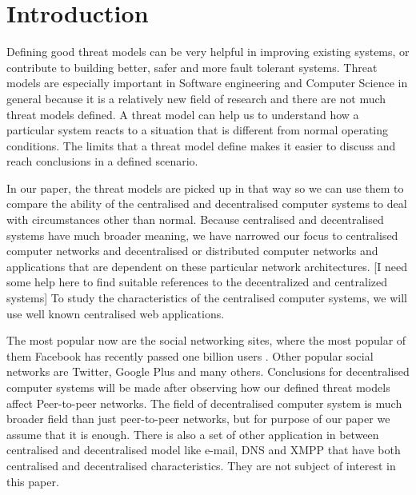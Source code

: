 \section{Introduction}
Defining good threat models can be very helpful in improving existing systems, or contribute to building better, safer and more fault tolerant systems. Threat models are especially important in Software engineering and Computer Science in general because it is a relatively new field of research and there are not much threat models defined. A threat model can help us to understand how a particular system reacts to a situation that is different from normal operating conditions. The limits that a threat model define makes it easier to discuss and reach conclusions in a defined scenario.

In our paper, the threat models are picked up in that way so we can use them to compare the ability of the centralised and decentralised computer systems to deal with circumstances other than normal. Because centralised and decentralised systems have much broader meaning, we have narrowed our focus to centralised computer networks and decentralised or distributed computer networks and applications that are dependent on these particular network architectures. [I need some help here to find suitable references to the decentralized and centralized systems] To study the characteristics of the centralised computer systems, we will use well known centralised web applications. 

The most popular now are the social networking sites, where the most popular of them Facebook has recently passed one billion users \cite{web:facebookpassesbillion}. Other popular social networks are Twitter, Google Plus and many others. Conclusions for decentralised computer systems will be made after observing how our defined threat models affect Peer-to-peer networks. The field of decentralised computer system is much broader field than just peer-to-peer networks, but for purpose of our paper we assume that it is enough. There is also a set of other application in between centralised and decentralised model like e-mail, DNS and XMPP that have both centralised and decentralised characteristics. They are not subject of interest in this paper.

